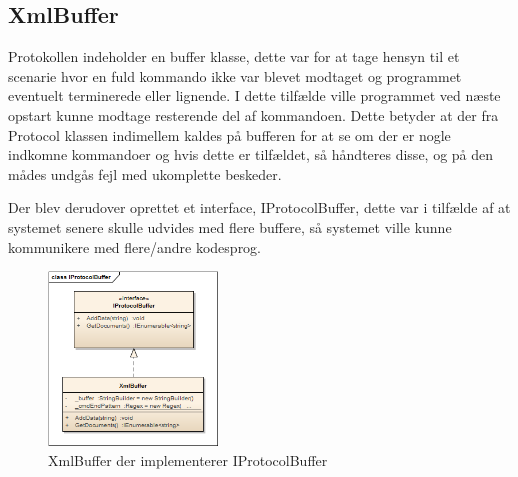 \subsection{XmlBuffer}
Protokollen indeholder en buffer klasse, dette var for at tage hensyn til et scenarie hvor en fuld kommando ikke var blevet modtaget og programmet eventuelt terminerede eller lignende. I dette tilfælde ville programmet ved næste opstart kunne modtage resterende del af kommandoen. Dette betyder at der fra Protocol klassen indimellem kaldes på bufferen for at se om der er nogle indkomne kommandoer og hvis dette er tilfældet, så håndteres disse, og på den mådes undgås fejl med ukomplette beskeder.

Der blev derudover oprettet et interface, IProtocolBuffer, dette var i tilfælde af at systemet senere skulle udvides med flere buffere, så systemet ville kunne kommunikere med flere/andre kodesprog.

\begin{figure}[H]
	\centering
	\includegraphics[width=0.4\textwidth]{Systemdesign/SharedLib/Images/Klasser/IProtocolBuffer.png}
	\caption{XmlBuffer der implementerer IProtocolBuffer}
	\label{fig:klasseXmlBuf}
\end{figure}
